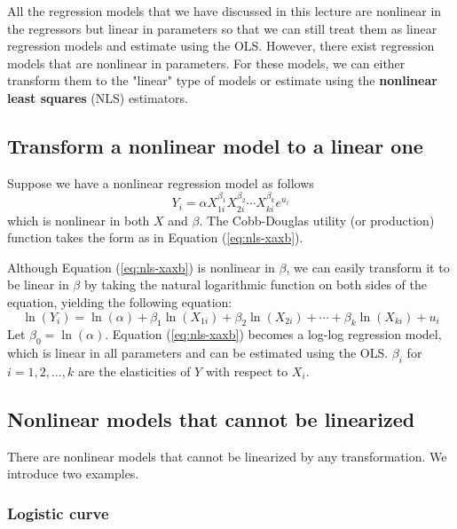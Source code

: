 \documentclass[a4paper,11pt]{article}
\begin{document}
All the regression models that we have discussed in this lecture are
nonlinear in the regressors but linear in parameters so that we can
still treat them as linear regression models and estimate using the
OLS. However, there exist regression models that are nonlinear in
parameters. For these models, we can either transform them to the
"linear" type of models or estimate using the \textbf{nonlinear least
squares} (NLS) estimators.

\subsection{Transform a nonlinear model to a linear one}
\label{sec:orgbd4ab50}

Suppose we have a nonlinear regression model as follows
\begin{equation}
\label{eq:nls-xaxb}
Y_i =  \alpha X_{1i}^{\beta_1}X_{2i}^{\beta_2}\cdots X_{ki}^{\beta_k}e^{u_i}
\end{equation}
which is nonlinear in both \(X\) and \(\beta\). The Cobb-Douglas utility
(or production) function takes the form as in Equation
(\ref{eq:nls-xaxb}).

Although Equation (\ref{eq:nls-xaxb}) is nonlinear in \(\beta\), we can
easily transform it to be linear in \(\beta\) by taking the natural
logarithmic function on both sides of the equation, yielding the
following equation:
\begin{equation}
\label{eq:nls-linear-xaxb}
\ln(Y_i) = \ln(\alpha) + \beta_1 \ln(X_{1i}) + \beta_2 \ln(X_{2i}) + \cdots + \beta_k \ln(X_{ki}) + u_i
\end{equation}
Let \(\beta_0 = \ln(\alpha)\). Equation (\ref{eq:nls-xaxb}) becomes a
log-log regression model, which is linear in all parameters and can be
estimated using the OLS. \(\beta_i\) for \(i=1, 2, \ldots, k\) are the
elasticities of \(Y\) with respect to \(X_i\).

\subsection{Nonlinear models that cannot be linearized}
\label{sec:org7b19ec5}

There are nonlinear models that cannot be linearized by any
transformation. We introduce two examples.

\subsubsection*{Logistic curve}
\label{sec:org6e64c46}
\end{document}
